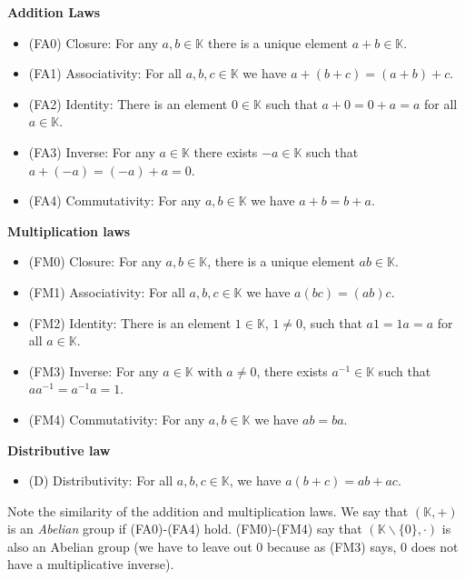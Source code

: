 \documentclass{article}
\theoremstyle{definition}
\begin{document}
\bigskip
\noindent
{\bf Addition Laws}
\smallskip
\begin{itemize}
\item [] (FA0) Closure: For any $a,b \in \mathbb{K}$ there is a 
               unique element $a+b \in \mathbb{K}$.
\item [] (FA1) Associativity: For all $a,b,c \in \mathbb{K}$ we have 
               $a+(b+c) = (a+b)+c$.
\item [] (FA2) Identity: There is an element $0 \in \mathbb{K}$ 
               such that $a+0= 0+a = a$ for all  $a \in \mathbb{K}$.
\item [] (FA3) Inverse: For any $a \in \mathbb{K}$ there exists 
               $-a \in \mathbb{K}$ such that $a+(-a) = (-a)+a = 0$.
\item [] (FA4) Commutativity: For any $a,b \in \mathbb{K}$ we have $a+b = b+a$.
\end{itemize}



\medskip
\noindent
{\bf Multiplication laws}
\smallskip
\begin{itemize}
\item [] (FM0) Closure: For any $a, b \in \mathbb{K}$, there is a unique element 
               $ab \in \mathbb{K}$.
\item [] (FM1) Associativity: For all $a,b,c \in \mathbb{K}$ we have $a(bc)=(ab)c$.
\item [] (FM2) Identity: There is an element $1 \in \mathbb{K}$, $1 \ne 0$,
               such that $a1 = 1a = a$ for all $a \in \mathbb{K}$.
\item [] (FM3) Inverse: For any $a \in \mathbb{K}$ with $a \ne 0$, there exists 
               $a^{-1} \in \mathbb{K}$ such that $aa^{-1} = a^{-1}a = 1$.
\item [] (FM4) Commutativity: For any $a,b \in \mathbb{K}$ we have $ab=ba$.
\end{itemize}

\medskip
\noindent
{\bf Distributive law}
\smallskip
\begin{itemize}
\item [] (D) Distributivity: For all $a,b,c \in \mathbb{K}$, we have $a(b+c) = ab+ac$.
\end{itemize}

\bigskip
\noindent
Note the similarity of the addition and multiplication laws. We say 
that $(\mathbb{K},+)$ is an \emph{Abelian} group if (FA0)-(FA4) hold. 
(FM0)-(FM4) say that $(\mathbb{K} \backslash \{0\}, \cdot)$ is 
also an Abelian group (we have to leave out $0$ because as (FM3) 
says, $0$ does not have a multiplicative inverse).
\end{document}

